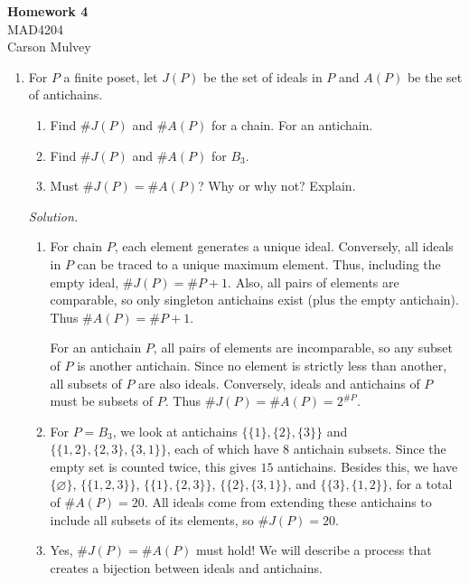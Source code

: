 \documentclass[11pt,letterpaper]{article}
\newenvironment{solution}{\color{blue}\textit{Solution.}}{\color{black}}
\begin{document}

\flushleft

\begin{center}
    \begin{large}
        \textbf{Homework 4} \\
        MAD4204 \\
        Carson Mulvey
    \end{large}
\end{center}

\pagestyle{empty}


\flushleft


\begin{enumerate}



\item For $P$ a finite poset, let $J(P)$ be the set of ideals in $P$ and $A(P)$ be the set of antichains.
\begin{enumerate}
	\item Find $\#J(P)$ and $\#A(P)$ for a chain. For an antichain.
	\item Find $\#J(P)$ and $\#A(P)$ for $B_3$.
	\item Must $\#J(P) = \#A(P)$? Why or why not? Explain.
\end{enumerate}

\begin{solution}
	\begin{enumerate}
		\item For chain $P$, each element generates a unique ideal. Conversely, all ideals in $P$ can be traced to a unique maximum element. Thus, including the empty ideal, $\#J(P)=\#P+1$. Also, all pairs of elements are comparable, so only singleton antichains exist (plus the empty antichain). Thus $\#A(P)=\#P+1$.
		
		For an antichain $P$, all pairs of elements are incomparable, so any subset of $P$ is another antichain. Since no element is strictly less than another, all subsets of $P$ are also ideals. Conversely, ideals and antichains of $P$ must be subsets of $P$. Thus $\#J(P)=\#A(P)=2^{\#P}$.

		\item For $P=B_3$, we look at antichains $\{\{1\},\{2\},\{3\}\}$ and $\{\{1,2\},\{2,3\},\{3,1\}\}$, each of which have $8$ antichain subsets. Since the empty set is counted twice, this gives $15$ antichains. Besides this, we have $\{\varnothing\}$, $\{\{1,2,3\}\}$, $\{\{1\},\{2,3\}\}$, $\{\{2\},\{3,1\}\}$, and $\{\{3\},\{1,2\}\}$, for a total of $\#A(P)=20$. All ideals come from extending these antichains to include all subsets of its elements, so $\#J(P)=20$.
		\item Yes, $\#J(P) = \#A(P)$ must hold! We will describe a process that creates a bijection between ideals and antichains.


\end{enumerate}
\end{solution}
\end{enumerate}
\end{document}
